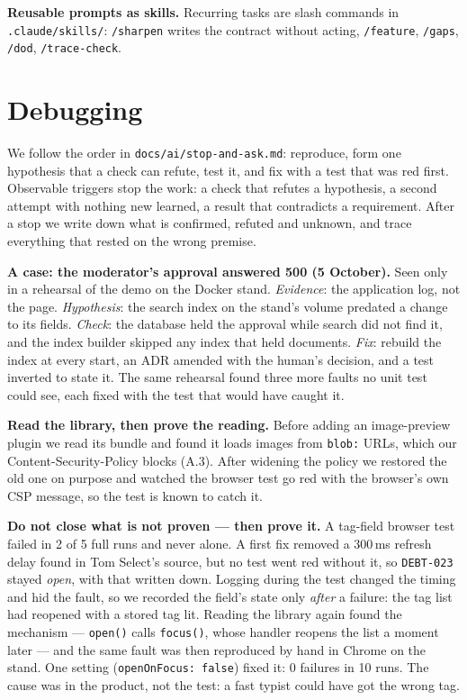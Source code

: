 \documentclass[11pt]{article}
\begin{document}
\textbf{Reusable prompts as skills.} Recurring tasks are slash commands in
\texttt{.claude/skills/}: \texttt{/sharpen} writes the contract without acting, \texttt{/feature},
\texttt{/gaps}, \texttt{/dod}, \texttt{/trace-check}.

\section{Debugging}

We follow the order in \texttt{docs/ai/stop-and-ask.md}: reproduce, form one hypothesis that a
check can refute, test it, and fix with a test that was red first. Observable triggers stop the work:
a check that refutes a hypothesis, a second attempt with nothing new learned, a result that
contradicts a requirement. After a stop we write down what is confirmed, refuted and unknown, and
trace everything that rested on the wrong premise.

\textbf{A case: the moderator's approval answered 500 (5 October).} Seen only in a rehearsal of the
demo on the Docker stand. \emph{Evidence}: the application log, not the page. \emph{Hypothesis}:
the search index on the stand's volume predated a change to its fields. \emph{Check}: the database
held the approval while search did not find it, and the index builder skipped any index that held
documents. \emph{Fix}: rebuild the index at every start, an ADR amended with the human's decision,
and a test inverted to state it. The same rehearsal found three more faults no unit test could see, each
fixed with the test that would have caught it.

\textbf{Read the library, then prove the reading.} Before adding an image-preview plugin we read its
bundle and found it loads images from \texttt{blob:} URLs, which our Content-Security-Policy blocks
(A.3). After widening the policy we restored the old one on purpose and watched the browser test go
red with the browser's own CSP message, so the test is known to catch it.

\textbf{Do not close what is not proven --- then prove it.} A tag-field browser test failed in 2
of 5 full runs and never alone. A first fix removed a 300\,ms refresh delay found in Tom Select's
source, but no test went red without it, so \texttt{DEBT-023} stayed \emph{open}, with that written
down. Logging during the test changed the timing and hid the fault, so we recorded the field's
state only \emph{after} a failure: the tag list had reopened with a stored tag lit. Reading the
library again found the mechanism --- \texttt{open()} calls \texttt{focus()}, whose handler reopens
the list a moment later --- and the same fault was then reproduced by hand in Chrome on the stand.
One setting (\texttt{openOnFocus: false}) fixed it: 0 failures in 10 runs. The cause was in the product, not the test: a fast typist could have got the wrong tag.
\end{document}
